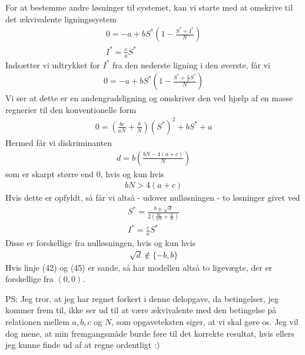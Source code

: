 \documentclass[12pt]{article}
\begin{document}
For at bestemme andre løsninger til systemet, kan vi starte med at omskrive til det ækvivalente ligningssystem
\begin{align}
0 = -a + bS^*\left(1 - \frac{S^* + I^*}{N} \right)\\
I^* = \frac{c}{a}S^*
\end{align}
Indsætter vi udtrykket for $I^*$ fra den nederste ligning i den øverste, får vi
\begin{align}
0 = -a + bS^*\left(1 - \frac{S^* + \frac{c}{a}S^*}{N} \right)
\end{align}
Vi ser at dette er en andengradsligning og omskriver den ved hjælp af en masse regnerier til den konventionelle form
\begin{align}
0 = \left(\frac{bc}{aN} + \frac{b}{N} \right)(S^*)^2 + bS^* + a
\end{align}
Hermed får vi diskriminanten
\begin{align}
d = b\left(\frac{bN - 4(a+c)}{N}\right)
\end{align}
som er skarpt større end 0, hvis og kun hvis
\begin{align}
bN > 4(a+c)
\end{align}
Hvis dette er opfyldt, så får vi altså - udover nulløsningen - to løsninger givet ved
\begin{align}
S^* = \frac{b \pm \sqrt{d}}{2\left(\frac{bc}{aN} + \frac{b}{N} \right)}\\
I^* = \frac{c}{a}S^*
\end{align}
Disse er forskellige fra nulløsningen, hvis og kun hvis
\begin{align}
\sqrt{d} \notin \{-b,b\}
\end{align}
Hvis linje (42) og (45) er sande, så har modellen altså to ligevægte, der er forskellige fra $(0,0)$. 

PS: Jeg tror, at jeg har regnet forkert i denne delopgave, da betingelser, jeg kommer frem til, ikke ser ud til at være ækvivalente med den betingelse på relationen mellem $a,b,c$ og $N$, som opgaveteksten siger, at vi skal gøre os. Jeg vil dog mene, at min fremgangsmåde burde føre til det korrekte resultat, hvis ellers jeg kunne finde ud af at regne ordentligt :)
\end{document}
